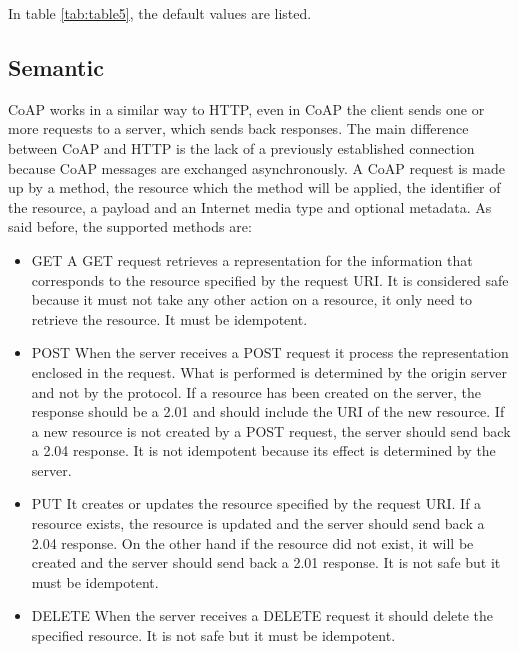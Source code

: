 	In table \ref{tab:table5}, the default values are listed.
	
	
	
	\subsection{Semantic}
	
	CoAP works in a similar way to HTTP, even in CoAP the client sends one or more requests to a server, which sends back responses.\newline
	The main difference between CoAP and HTTP is the lack of a previously established connection because CoAP messages are exchanged asynchronously.\newline
	A CoAP request is made up by a method, the resource which the method will be applied, the identifier of the resource,
	a payload and an Internet media type and optional metadata.\newline
	As said before, the supported methods are:\newline
	\begin{itemize}
		\item GET A GET request retrieves a representation for the information that corresponds to the resource specified by the request URI.
		It is considered safe because it must not take any other action on a resource, it only need to retrieve the resource.
		It must be idempotent.
		
		\item POST When the server receives a POST request it process the representation enclosed in the request.
		What is performed is determined by the origin server and not by the protocol.
		If a resource has been created on the server, the response should be a 2.01 and should include the URI of the new resource.
		If a new resource is not created by a POST request, the server should send back a 2.04 response.
		It is not idempotent because its effect is determined by the server.
		
		\item PUT It creates or updates the resource specified by the request URI.
		If a resource exists, the resource is updated and the server should send back a 2.04 response.
		On the other hand if the resource did not exist, it will be created and the server should send back a 2.01 response.
		It is not safe but it must be idempotent.
		
		\item DELETE When the server receives a DELETE request it should delete the specified resource.
		It is not safe but it must be idempotent.
		
	\end{itemize}
